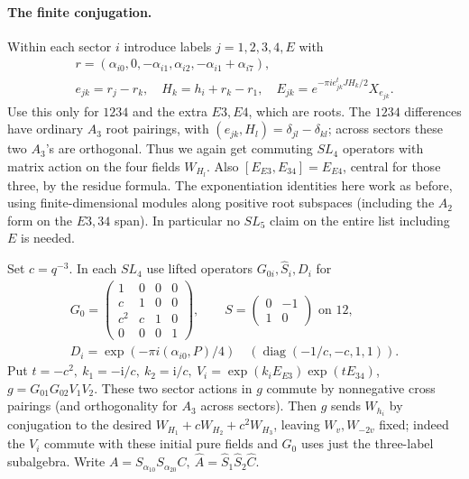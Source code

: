 \paragraph{The finite conjugation.} Within each sector \(i\) introduce labels \(j=1,2,3,4,E\) with
\[\begin{gathered}
 r=(\alpha_{i0},0,-\alpha_{i1},\alpha_{i2},-\alpha_{i1}+\alpha_{i7}),\\
 e_{jk}=r_j-r_k,\quad H_k=h_i+r_k-r_1,\quad E_{jk}=e^{-\pi i e_{jk}^t J H_k/2} X_{e_{jk}} .
\end{gathered}\]
Use this only for \(1234\) and the extra \(E3,E4\), which are roots. The \(1234\) differences have ordinary \(A_3\) root pairings, with \((e_{jk},H_l)=\delta_{jl}-\delta_{kl}\); across sectors these two \(A_3\)'s are orthogonal. Thus we again get commuting \(SL_4\) operators with matrix action on the four fields \(W_{H_l}\). Also \([E_{E3},E_{34}]=E_{E4}\), central for those three, by the residue formula. The exponentiation identities here work as before, using finite-dimensional modules along positive root subspaces (including the \(A_2\) form on the \(E3,34\) span). In particular no \(SL_5\) claim on the entire list including \(E\) is needed.

Set \(c=q^{-3}\). In each \(SL_4\) use lifted operators \(G_{0i},\widehat S_i,D_i\) for
\[
\begin{gathered}
 G_0=\begin{pmatrix}1&0&0&0\\c&1&0&0\\c^2&c&1&0\\0&0&0&1\end{pmatrix},
 \qquad S=\begin{pmatrix}0&-1\\1&0\end{pmatrix}\text{ on }12,\\
 D_i=\exp(-\pi i(\alpha_{i0},P)/4)\quad(\operatorname{diag}(-1/c,-c,1,1)).
\end{gathered}
\]
Put \(t=-c^2,\ k_1=-\mathrm{i}/c,\ k_2=\mathrm{i}/c,\ V_i=\exp(k_iE_{E3})\exp(t E_{34})\), \(g=G_{01}G_{02}V_1 V_2\). These two sector actions in \(g\) commute by nonnegative cross pairings (and orthogonality for \(A_3\) across sectors). Then \(g\) sends \(W_{h_i}\) by conjugation to the desired \(W_{H_1}+cW_{H_2}+c^2W_{H_3}\), leaving \(W_v,W_{-2v}\) fixed; indeed the \(V_i\) commute with these initial pure fields and \(G_0\) uses just the three-label subalgebra. Write \(A=S_{\alpha_{10}}S_{\alpha_{20}}C,\ \widehat A=\widehat S_1\widehat S_2\widehat C\).

